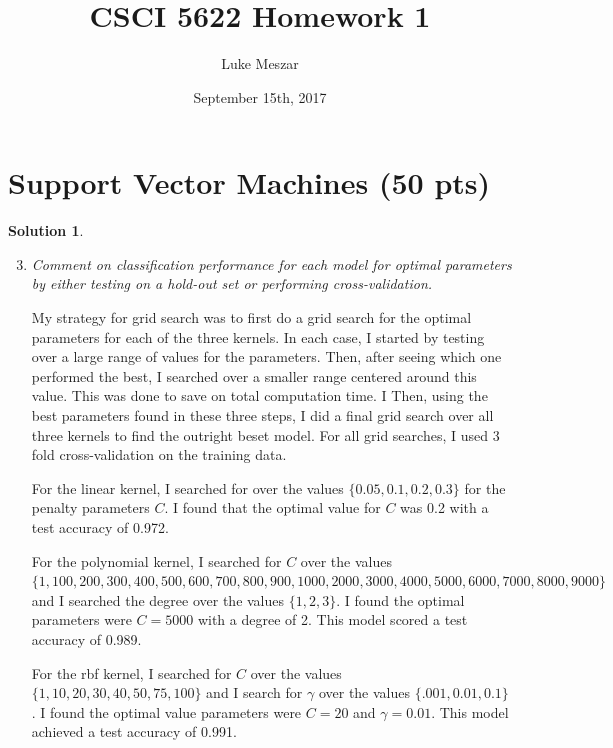 \documentclass[12pt]{article}
\author{Luke Meszar}
\date{September 15th, 2017}
\title{CSCI 5622 Homework 1}
\theoremstyle{definition}
\newtheorem*{solution*}{Solution}
\begin{document}
	\thispagestyle{empty}
	
	\newlength{\boxlength}\setlength{\boxlength}{\textwidth}
	\addtolength{\boxlength}{-4mm}
	
	\begin{center}
	\end{center}
	\section{Support Vector Machines (50 pts)}																																									
	\begin{solution*}\leavevmode
		\begin{enumerate}[label=\arabic*.,font=\upshape]
			\setcounter{enumi}{2}
			\item \textit{ Comment on classification performance for each model for optimal parameters by either
				testing on a hold-out set or performing cross-validation.}
			
				My strategy for grid search  was to first do a grid search for the optimal parameters for each of the three kernels. In each case, I started by testing over a large range of values for the parameters. Then, after seeing which one performed the best, I searched over a smaller range centered around this value. This was done to save on total computation time. I  Then, using the best parameters found in these three steps, I did a final grid search over all three kernels to find the outright beset model. For all grid searches, I used 3 fold cross-validation on the training data. 
				
				For the linear kernel, I searched for over the values $\{0.05,0.1,0.2,0.3\}$ for the penalty parameters $C$. I found that the optimal value for $C$ was 0.2 with a test accuracy of 0.972. 
				
				For the polynomial kernel, I searched for $C$ over the values $\{1,100,200,300,400,500, 600,700,800,900,1000,2000,3000,4000,5000,6000,7000,8000,9000\}$ and I searched the degree over the values $\{1,2,3\}$. I found the optimal parameters were $C = 5000$ with a degree of 2. This model scored a test accuracy of 0.989. 
				
				For the rbf kernel, I searched for $C$ over the values $\{1,10,20,30,40,50,75,100\}$ and I search for $\gamma$ over the values $\{.001,0.01,0.1\}$. I found the optimal value parameters were $C = 20$ and $\gamma = 0.01$. This model achieved a test accuracy of 0.991.
				

\end{enumerate}
\end{solution*}
\end{document}
